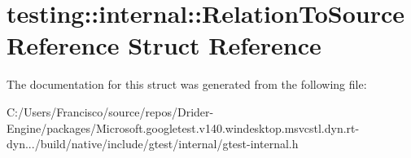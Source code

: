 \hypertarget{structtesting_1_1internal_1_1_relation_to_source_reference}{}\section{testing\+:\+:internal\+:\+:Relation\+To\+Source\+Reference Struct Reference}
\label{structtesting_1_1internal_1_1_relation_to_source_reference}


The documentation for this struct was generated from the following file\+:\begin{DoxyCompactItemize}
\item 
C\+:/\+Users/\+Francisco/source/repos/\+Drider-\/\+Engine/packages/\+Microsoft.\+googletest.\+v140.\+windesktop.\+msvcstl.\+dyn.\+rt-\/dyn.../build/native/include/gtest/internal/gtest-\/internal.\+h\end{DoxyCompactItemize}
